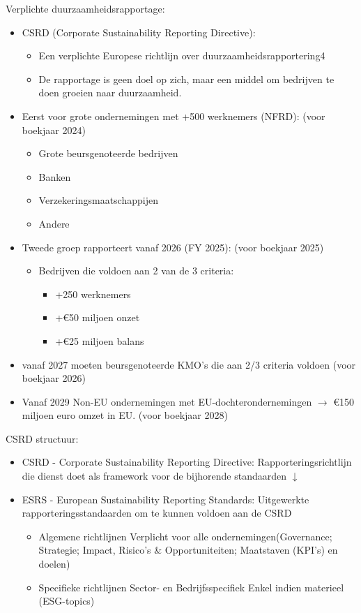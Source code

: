 \documentclass[12pt]{article}
\begin{document}
Verplichte duurzaamheidsrapportage:\begin{itemize}
    \item CSRD (Corporate Sustainability Reporting Directive):\begin{itemize}
        \item Een verplichte Europese richtlijn over duurzaamheidsrapportering4
        \item De rapportage is geen doel op zich, maar een middel om bedrijven te
        doen groeien naar duurzaamheid.
    \end{itemize}
    \item Eerst voor grote ondernemingen met +500 werknemers (NFRD): (voor boekjaar 2024)\begin{itemize}
        \item Grote beursgenoteerde bedrijven 
        \item Banken 
        \item Verzekeringsmaatschappijen 
        \item Andere
    \end{itemize}
    \item Tweede groep rapporteert vanaf 2026 (FY 2025): (voor boekjaar 2025)\begin{itemize}
        \item Bedrijven die voldoen aan 2 van de 3 criteria:\begin{itemize}
            \item +250 werknemers 
            \item +€50 miljoen onzet 
            \item +€25 miljoen balans
        \end{itemize}
    \end{itemize}
    \item vanaf 2027 moeten beursgenoteerde KMO's die aan 2/3 criteria voldoen (voor boekjaar 2026)
    \item Vanaf 2029 Non-EU ondernemingen met EU-dochterondernemingen $\rightarrow$ €150 miljoen euro omzet in EU. (voor boekjaar 2028)
\end{itemize}
CSRD structuur:\begin{itemize}
    \item CSRD - Corporate Sustainability Reporting Directive: Rapporteringsrichtlijn die dienst doet als framework voor de bijhorende standaarden $\downarrow$ 
    \item ESRS - European Sustainability Reporting Standards: Uitgewerkte rapporteringsstandaarden om te kunnen voldoen aan de CSRD\begin{itemize}
        \item Algemene richtlijnen Verplicht voor alle ondernemingen(Governance; Strategie; Impact, Risico's \& Opportuniteiten; Maatstaven (KPI's) en doelen)
        \item Specifieke richtlijnen Sector- en Bedrijfsspecifiek Enkel indien materieel (ESG-topics)
    \end{itemize} 
\end{itemize}
\end{document}
